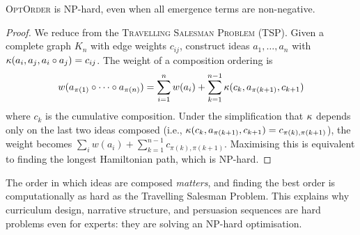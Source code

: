 \begin{theorem}
\label{thm:optorder-hard}
\textsc{OptOrder} is NP-hard, even when all emergence terms are
non-negative.
\end{theorem}

\begin{proof}
We reduce from the \textsc{Travelling Salesman Problem} (TSP).
Given a complete graph $K_n$ with edge weights $c_{ij}$,
construct ideas $a_1,\ldots,a_n$ with
$\kappa(a_i, a_j, a_i \circ a_j) = c_{ij}$.
The weight of a composition ordering is
\[
  w(a_{\pi(1)} \circ \cdots \circ a_{\pi(n)})
  = \sum_{i=1}^{n} w(a_i)
  + \sum_{k=1}^{n-1} \kappa(c_k, a_{\pi(k+1)}, c_{k+1})
\]
where $c_k$ is the cumulative composition.  Under the
simplification that $\kappa$ depends only on the last two
ideas composed (i.e., $\kappa(c_k, a_{\pi(k+1)}, c_{k+1})
= c_{\pi(k),\pi(k+1)}$), the weight becomes
$\sum_i w(a_i) + \sum_{k=1}^{n-1} c_{\pi(k),\pi(k+1)}$.
Maximising this is equivalent to finding the longest Hamiltonian
path, which is NP-hard.
\end{proof}

\begin{interpretation}
The order in which ideas are composed \emph{matters}, and finding
the best order is computationally as hard as the Travelling
Salesman Problem.  This explains why curriculum design, narrative
structure, and persuasion sequences are hard problems even for
experts: they are solving an NP-hard optimisation.
\end{interpretation}

